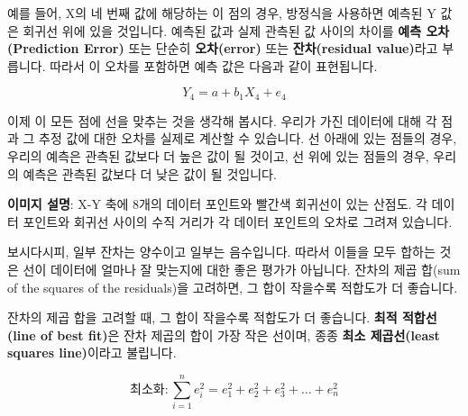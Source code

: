 \documentclass[11pt,a4paper]{book}
\theoremstyle{definition}
\begin{document}
\begin{tcolorbox}[infobox, title={회귀 방정식 (Regression Equation)}]
예를 들어, X의 네 번째 값에 해당하는 이 점의 경우, 방정식을 사용하면 예측된 Y 값은 회귀선 위에 있을 것입니다. 예측된 값과 실제 관측된 값 사이의 차이를 \textbf{예측 오차(Prediction Error)} 또는 단순히 \textbf{오차(error)} 또는 \textbf{잔차(residual value)}라고 부릅니다. 따라서 이 오차를 포함하면 예측 값은 다음과 같이 표현됩니다.

\begin{equation*}
Y_4 = a + b_1X_4 + e_4
\end{equation*}

이제 이 모든 점에 선을 맞추는 것을 생각해 봅시다. 우리가 가진 데이터에 대해 각 점과 그 추정 값에 대한 오차를 실제로 계산할 수 있습니다. 선 아래에 있는 점들의 경우, 우리의 예측은 관측된 값보다 더 높은 값이 될 것이고, 선 위에 있는 점들의 경우, 우리의 예측은 관측된 값보다 더 낮은 값이 될 것입니다.

\begin{center}
\end{center}
\textbf{이미지 설명}: X-Y 축에 8개의 데이터 포인트와 빨간색 회귀선이 있는 산점도. 각 데이터 포인트와 회귀선 사이의 수직 거리가 각 데이터 포인트의 오차로 그려져 있습니다.

보시다시피, 일부 잔차는 양수이고 일부는 음수입니다. 따라서 이들을 모두 합하는 것은 선이 데이터에 얼마나 잘 맞는지에 대한 좋은 평가가 아닙니다. 잔차의 제곱 합(sum of the squares of the residuals)을 고려하면, 그 합이 작을수록 적합도가 더 좋습니다.
\end{tcolorbox}

\begin{tcolorbox}[infobox, title={최적 적합선 (Line of Best Fit)}]
잔차의 제곱 합을 고려할 때, 그 합이 작을수록 적합도가 더 좋습니다. \textbf{최적 적합선(line of best fit)}은 잔차 제곱의 합이 가장 작은 선이며, 종종 \textbf{최소 제곱선(least squares line)}이라고 불립니다.

\begin{equation*}
\text{최소화}: \sum_{i=1}^{n} e_i^2 = e_1^2 + e_2^2 + e_3^2 + \dots + e_n^2
\end{equation*}
\end{tcolorbox}
\end{document}
